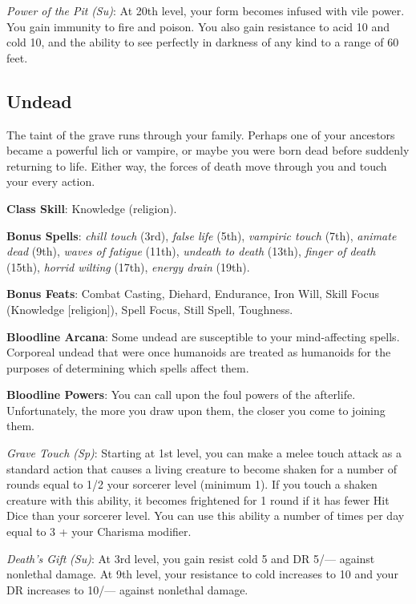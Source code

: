 \textit{Power of the Pit} \textit{(Su)}: At 20th level, your form becomes infused with vile power. You gain immunity to fire and poison. You also gain resistance to acid 10 and cold 10, and the ability to see perfectly in darkness of any kind to a range of 60 feet.
				
\subsection{Undead}

				
The taint of the grave runs through your family. Perhaps one of your ancestors became a powerful lich or vampire, or maybe you were born dead before suddenly returning to life. Either way, the forces of death move through you and touch your every action.
				
\textbf{Class Skill}: Knowledge (religion).
				
\textbf{Bonus Spells}: \textit{chill touch} (3rd), \textit{false life} (5th), \textit{vampiric touch} (7th), \textit{animate dead} (9th), \textit{waves of fatigue} (11th), \textit{undeath to death} (13th), \textit{finger of death} (15th), \textit{horrid wilting} (17th), \textit{energy drain} (19th).
				
\textbf{Bonus Feats}: Combat Casting, Diehard, Endurance, Iron Will, Skill Focus (Knowledge \mbox{$[$}religion\mbox{$]$}), Spell Focus, Still Spell, Toughness.
				
\textbf{Bloodline Arcana}: Some undead are susceptible to your mind-affecting spells. Corporeal undead that were once humanoids are treated as humanoids for the purposes of determining which spells affect them.
				
\textbf{Bloodline Powers}: You can call upon the foul powers of the afterlife. Unfortunately, the more you draw upon them, the closer you come to joining them.
				
\textit{Grave Touch (Sp)}: Starting at 1st level, you can make a melee touch attack as a standard action that causes a living creature to become shaken for a number of rounds equal to 1/2 your sorcerer level (minimum 1). If you touch a shaken creature with this ability, it becomes frightened for 1 round if it has fewer Hit Dice than your sorcerer level. You can use this ability a number of times per day equal to 3 + your Charisma modifier.
				
\textit{Death's Gift} \textit{(Su)}: At 3rd level, you gain resist cold 5 and DR 5/--- against nonlethal damage. At 9th level, your resistance to cold increases to 10 and your DR increases to 10/--- against nonlethal damage.
				
